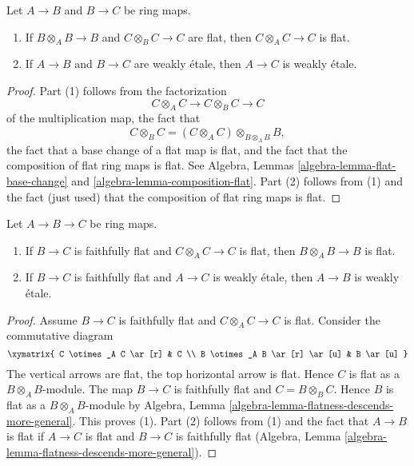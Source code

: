 \begin{lemma}
\label{lemma-composition-weakly-etale}
Let $A \to B$ and $B \to C$ be ring maps.
\begin{enumerate}
\item If $B \otimes_A B \to B$ and $C \otimes_B C \to C$
are flat, then $C \otimes_A C \to C$ is flat.
\item If $A \to B$ and $B \to C$ are weakly \'etale, then $A \to C$
is weakly \'etale.
\end{enumerate}
\end{lemma}

\begin{proof}
Part (1) follows from the factorization
$$
C \otimes_A C \longrightarrow C \otimes_B C \longrightarrow C
$$
of the multiplication map, the fact that
$$
C \otimes_B C = (C \otimes_A C) \otimes_{B \otimes_A B} B,
$$
the fact that a base change of a flat map is flat, and the
fact that the composition of flat ring maps is flat.
See Algebra, Lemmas \ref{algebra-lemma-flat-base-change} and
\ref{algebra-lemma-composition-flat}.
Part (2) follows from (1) and the fact (just used) that the
composition of flat ring maps is flat.
\end{proof}

\begin{lemma}
\label{lemma-go-down}
Let $A \to B \to C$ be ring maps.
\begin{enumerate}
\item If $B \to C$ is faithfully flat and $C \otimes_A C \to C$ is flat,
then $B \otimes_A B \to B$ is flat.
\item If $B \to C$ is faithfully flat and $A \to C$ is weakly \'etale,
then $A \to B$ is weakly \'etale.
\end{enumerate}
\end{lemma}

\begin{proof}
Assume $B \to C$ is faithfully flat and $C \otimes_A C \to C$ is flat.
Consider the commutative diagram
$$
\xymatrix{
C \otimes_A C \ar[r] & C \\
B \otimes_A B \ar[r] \ar[u] & B \ar[u]
}
$$
The vertical arrows are flat, the top horizontal arrow is flat.
Hence $C$ is flat as a $B \otimes_A B$-module. The map $B \to C$ is
faithfully flat and $C = B \otimes_B C$. Hence $B$ is flat as a
$B \otimes_A B$-module by
Algebra, Lemma \ref{algebra-lemma-flatness-descends-more-general}.
This proves (1). Part (2) follows from (1) and the fact that
$A \to B$ is flat if $A \to C$ is flat and $B \to C$ is faithfully flat
(Algebra, Lemma \ref{algebra-lemma-flatness-descends-more-general}).
\end{proof}

